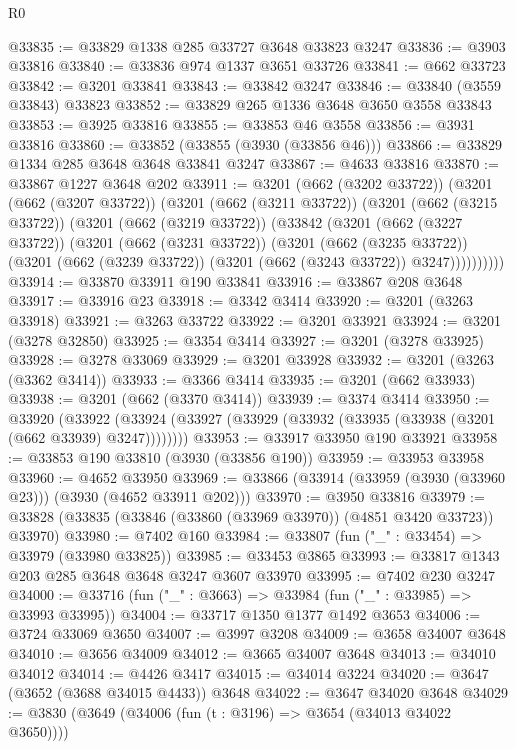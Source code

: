 \begin{lexlean}{R0}
\begin{coremodule}
@33835 := @33829 @1338 @285 @33727 @3648 @33823 @3247
@33836 := @3903 @33816
@33840 := @33836 @974 @1337 @3651 @33726
@33841 := @662 @33723
@33842 := @3201 @33841
@33843 := @33842 @3247
@33846 := @33840 (@3559 @33843) @33823
@33852 := @33829 @265 @1336 @3648 @3650 @3558 @33843
@33853 := @3925 @33816
@33855 := @33853 @46 @3558
@33856 := @3931 @33816
@33860 := @33852 (@33855 (@3930 (@33856 @46)))
@33866 := @33829 @1334 @285 @3648 @3648 @33841 @3247
@33867 := @4633 @33816
@33870 := @33867 @1227 @3648 @202
@33911 := @3201
    (@662 (@3202 @33722))
    (@3201
      (@662 (@3207 @33722))
      (@3201
        (@662 (@3211 @33722))
        (@3201
          (@662 (@3215 @33722))
          (@3201
            (@662 (@3219 @33722))
            (@33842
              (@3201
                (@662 (@3227 @33722))
                (@3201
                  (@662 (@3231 @33722))
                  (@3201
                    (@662 (@3235 @33722))
                    (@3201 (@662 (@3239 @33722)) (@3201 (@662 (@3243 @33722)) @3247))))))))))
@33914 := @33870 @33911 @190 @33841
@33916 := @33867 @208 @3648
@33917 := @33916 @23
@33918 := @3342 @3414
@33920 := @3201 (@3263 @33918)
@33921 := @3263 @33722
@33922 := @3201 @33921
@33924 := @3201 (@3278 @32850)
@33925 := @3354 @3414
@33927 := @3201 (@3278 @33925)
@33928 := @3278 @33069
@33929 := @3201 @33928
@33932 := @3201 (@3263 (@3362 @3414))
@33933 := @3366 @3414
@33935 := @3201 (@662 @33933)
@33938 := @3201 (@662 (@3370 @3414))
@33939 := @3374 @3414
@33950 := @33920
    (@33922 (@33924 (@33927 (@33929 (@33932 (@33935 (@33938 (@3201 (@662 @33939) @3247))))))))
@33953 := @33917 @33950 @190 @33921
@33958 := @33853 @190 @33810 (@3930 (@33856 @190))
@33959 := @33953 @33958
@33960 := @4652 @33950
@33969 := @33866 (@33914 (@33959 (@3930 (@33960 @23))) (@3930 (@4652 @33911 @202)))
@33970 := @3950 @33816
@33979 := @33828 (@33835 (@33846 (@33860 (@33969 @33970)) (@4851 @3420 @33723)) @33970)
@33980 := @7402 @160
@33984 := @33807 (fun ("_" : @33454) => @33979 (@33980 @33825))
@33985 := @33453 @3865
@33993 := @33817 @1343 @203 @285 @3648 @3648 @3247 @3607 @33970
@33995 := @7402 @230 @3247
@34000 := @33716 (fun ("_" : @3663) => @33984 (fun ("_" : @33985) => @33993 @33995))
@34004 := @33717 @1350 @1377 @1492 @3653
@34006 := @3724 @33069 @3650
@34007 := @3997 @3208
@34009 := @3658 @34007 @3648
@34010 := @3656 @34009
@34012 := @3665 @34007 @3648
@34013 := @34010 @34012
@34014 := @4426 @3417
@34015 := @34014 @3224
@34020 := @3647 (@3652 (@3688 @34015 @4433)) @3648
@34022 := @3647 @34020 @3648
@34029 := @3830 (@3649 (@34006 (fun (t : @3196) => @3654 (@34013 @34022 @3650))))

\end{coremodule}
\end{lexlean}
